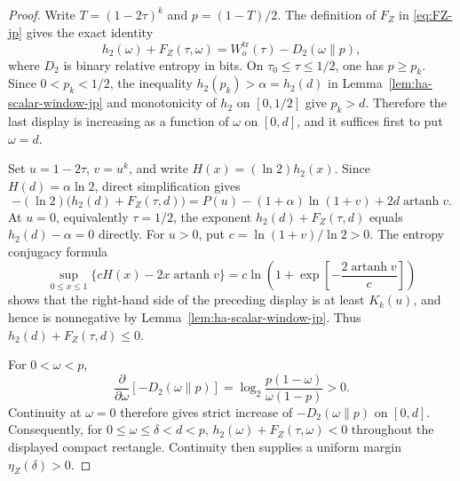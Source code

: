 \documentclass[11pt]{article}
\theoremstyle{definition}
\newcommand{\h}{h_2}
\begin{document}
\begin{proof}
Write \(T=(1-2\tau)^k\) and \(p=(1-T)/2\).  The definition of
\(F_Z\) in \eqref{eq:FZ-jp} gives the exact identity
\[
\h(\omega)+F_Z(\tau,\omega)
=W_o^{\mathrm{tr}}(\tau)-D_2(\omega\|p),
\]
where \(D_2\) is binary relative entropy in bits.  On
\(\tau_0\le\tau\le1/2\), one has \(p\ge p_k\).  Since
\(0<p_k<1/2\), the inequality
\(\h(p_k)>\alpha=\h(d)\) in Lemma~\ref{lem:ha-scalar-window-jp} and
monotonicity of \(\h\) on \([0,1/2]\) give \(p_k>d\).  Therefore the last display is increasing as a function
of \(\omega\) on \([0,d]\), and it suffices first to put \(\omega=d\).

Set \(u=1-2\tau\), \(v=u^k\), and write
\(H(x)=(\ln2)\h(x)\).  Since \(H(d)=\alpha\ln2\), direct simplification
gives
\[
-(\ln2)\bigl(\h(d)+F_Z(\tau,d)\bigr)
=P(u)-(1+\alpha)\ln(1+v)+2d\operatorname{artanh}v.
\]
At \(u=0\), equivalently \(\tau=1/2\), the exponent
\(\h(d)+F_Z(\tau,d)\) equals \(\h(d)-\alpha=0\) directly.
For \(u>0\), put \(c=\ln(1+v)/\ln2>0\). The entropy conjugacy formula
\[
\sup_{0\le x\le1}\{cH(x)-2x\operatorname{artanh}v\}
=c\ln\!\left(1+\exp\!\left[-\frac{2\operatorname{artanh}v}{c}\right]\right)
\]
shows that the right-hand side of the preceding display is at least
\(K_k(u)\), and hence is nonnegative by
Lemma~\ref{lem:ha-scalar-window-jp}.  Thus
\(\h(d)+F_Z(\tau,d)\le0\).

For \(0<\omega<p\),
\[
\frac{\partial}{\partial\omega}[-D_2(\omega\|p)]
=\log_2\frac{p(1-\omega)}{\omega(1-p)}>0.
\]
Continuity at \(\omega=0\) therefore gives strict increase of
\(-D_2(\omega\|p)\) on \([0,d]\). Consequently, for
\(0\le\omega\le\delta<d<p\),
\(\h(\omega)+F_Z(\tau,\omega)<0\) throughout the displayed compact
rectangle.  Continuity then supplies a uniform margin
\(\eta_Z(\delta)>0\).
\end{proof}
\end{document}
